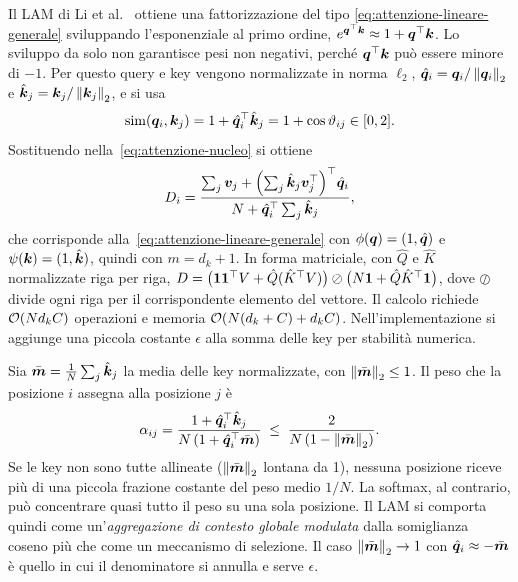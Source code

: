 Il LAM di Li et al.~\cite{li2020lam} ottiene una fattorizzazione del tipo
\eqref{eq:attenzione-lineare-generale} sviluppando l'esponenziale al primo ordine,
$e^{\bm{q}^{\top}\bm{k}}\approx1+\bm{q}^{\top}\bm{k}$. Lo sviluppo da solo non garantisce pesi non
negativi, perché $\bm{q}^{\top}\bm{k}$ può essere minore di $-1$. Per questo query e key vengono
normalizzate in norma $\ell_2$, $\hat{\bm{q}}_i=\bm{q}_i/\left\lVert \bm{q}_i \right\rVert_2$ e
$\hat{\bm{k}}_j=\bm{k}_j/\left\lVert \bm{k}_j \right\rVert_2$, e si usa
\begin{equation}
  \mathrm{sim}(\bm{q}_i,\bm{k}_j)=1+\hat{\bm{q}}_i^{\top}\hat{\bm{k}}_j=1+\cos\vartheta_{ij}\in[0,2].
\end{equation}
Sostituendo nella~\eqref{eq:attenzione-nucleo} si ottiene
\begin{equation}
  D_i=\frac{\sum_{j}\bm{v}_j+\Bigl(\sum_{j}\hat{\bm{k}}_j\bm{v}_j^{\top}\Bigr)^{\top}\hat{\bm{q}}_i}
           {N+\hat{\bm{q}}_i^{\top}\sum_{j}\hat{\bm{k}}_j},
  \label{eq:lam}
\end{equation}
che corrisponde alla~\eqref{eq:attenzione-lineare-generale} con
$\phi(\bm{q})=(1,\hat{\bm{q}})$ e $\psi(\bm{k})=(1,\hat{\bm{k}})$, quindi con $m=d_k+1$.
In forma matriciale, con $\hat Q$ e $\hat K$ normalizzate riga per riga,
$D=\bigl(\bm{1}\bm{1}^{\top} V+\hat Q(\hat K^{\top} V)\bigr)\oslash\bigl(N\bm{1}+\hat Q\hat K^{\top}\bm{1}\bigr)$,
dove $\oslash$ divide ogni riga per il corrispondente elemento del vettore. Il calcolo richiede
$\mathcal{O}\!\left(N d_k C\right)$ operazioni e memoria $\mathcal{O}\!\left(N(d_k+C)+d_kC\right)$. Nell'implementazione si aggiunge
una piccola costante $\epsilon$ alla somma delle key per stabilità numerica.

\begin{osservazione}
\label{oss:contrasto}
Sia $\bar{\bm{m}}=\frac1N\sum_j\hat{\bm{k}}_j$ la media delle key normalizzate, con
$\left\lVert \bar{\bm{m}} \right\rVert_2\le1$. Il peso che la posizione $i$ assegna alla posizione $j$ è
\[
  \alpha_{ij}=\frac{1+\hat{\bm{q}}_i^{\top}\hat{\bm{k}}_j}{N\,(1+\hat{\bm{q}}_i^{\top}\bar{\bm{m}})}
  \;\leq\;\frac{2}{N\,(1-\left\lVert \bar{\bm{m}} \right\rVert_2)} .
\]
Se le key non sono tutte allineate ($\left\lVert \bar{\bm{m}} \right\rVert_2$ lontana da 1), nessuna posizione
riceve più di una piccola frazione costante del peso medio $1/N$. La softmax, al contrario, può
concentrare quasi tutto il peso su una sola posizione. Il LAM si comporta quindi come
un'\emph{aggregazione di contesto globale modulata} dalla somiglianza coseno più che come un
meccanismo di selezione. Il caso $\left\lVert \bar{\bm{m}} \right\rVert_2\to1$ con
$\hat{\bm{q}}_i\approx-\bar{\bm{m}}$ è quello in cui il denominatore si annulla e serve
$\epsilon$.
\end{osservazione}

